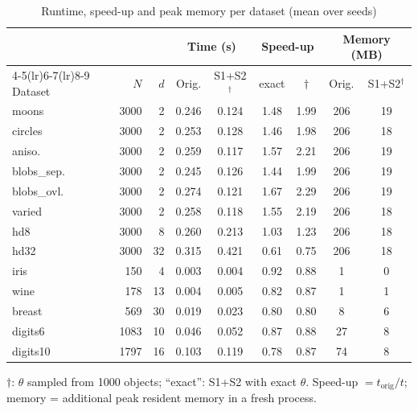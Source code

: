 \begin{table}[!t]
\centering
\caption{Runtime, speed-up and peak memory per dataset (mean over seeds)}
\label{tab:efficiency}
\scriptsize
\setlength{\tabcolsep}{2.6pt}
\begin{tabular}{lrrcccccc}
\toprule
 & & & \multicolumn{2}{c}{Time (s)} & \multicolumn{2}{c}{Speed-up} & \multicolumn{2}{c}{Memory (MB)} \\
\cmidrule(lr){4-5}\cmidrule(lr){6-7}\cmidrule(lr){8-9}
Dataset & $N$ & $d$ & Orig. & S1+S2$^{\dagger}$ & exact & $\dagger$ & Orig. & S1+S2$^{\dagger}$ \\
\midrule
moons & 3000 & 2 & 0.246 & 0.124 & 1.48 & 1.99 & 206 & 19 \\
circles & 3000 & 2 & 0.253 & 0.128 & 1.46 & 1.98 & 206 & 18 \\
aniso. & 3000 & 2 & 0.259 & 0.117 & 1.57 & 2.21 & 206 & 19 \\
blobs\_sep. & 3000 & 2 & 0.245 & 0.126 & 1.44 & 1.99 & 206 & 19 \\
blobs\_ovl. & 3000 & 2 & 0.274 & 0.121 & 1.67 & 2.29 & 206 & 19 \\
varied & 3000 & 2 & 0.258 & 0.118 & 1.55 & 2.19 & 206 & 18 \\
hd8 & 3000 & 8 & 0.260 & 0.213 & 1.03 & 1.23 & 206 & 18 \\
hd32 & 3000 & 32 & 0.315 & 0.421 & 0.61 & 0.75 & 206 & 18 \\
iris & 150 & 4 & 0.003 & 0.004 & 0.92 & 0.88 & 1 & 0 \\
wine & 178 & 13 & 0.004 & 0.005 & 0.82 & 0.87 & 1 & 1 \\
breast & 569 & 30 & 0.019 & 0.023 & 0.80 & 0.80 & 8 & 6 \\
digits6 & 1083 & 10 & 0.046 & 0.052 & 0.87 & 0.88 & 27 & 8 \\
digits10 & 1797 & 16 & 0.103 & 0.119 & 0.78 & 0.87 & 74 & 8 \\
\bottomrule
\end{tabular}
\vspace{2pt}
\parbox{\columnwidth}{\footnotesize $\dagger$: $\theta$ sampled from 1000 objects; ``exact'': S1+S2 with exact $\theta$. Speed-up $=t_{\mathrm{orig}}/t$; memory = additional peak resident memory in a fresh process.}
\end{table}